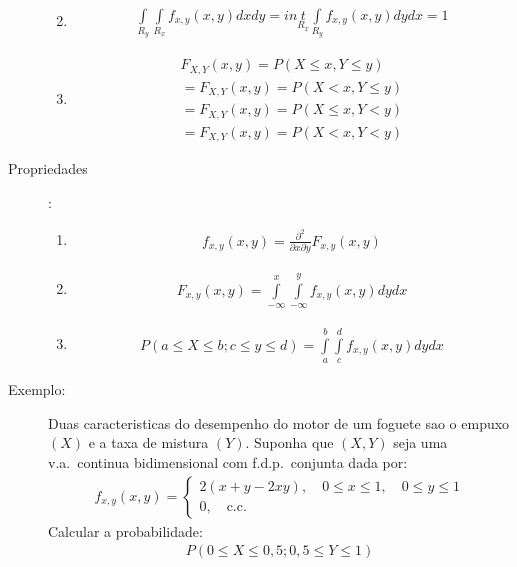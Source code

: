 \begin{description}
\begin{enumerate}[leftmargin=*, label=\roman*., widest=IV, align=left]
\begin{align}
     \end{align} 
    \item  
     \begin{align*}
      \int \limits_{R_{y}} \int \limits_{R_{x}} f_{x,y} (x,y) dx dy = int \limits_{R_{x}} \int \limits_{R_{y}} f_{x,y} (x,y) dy dx= 1
     \end{align*} 
    \item 
      \begin{align*}
        F_{X,Y}(x,y) = P(X \leq x, Y\leq y)\\
        = F_{X,Y}(x,y) = P(X < x, Y\leq y)\\
        = F_{X,Y}(x,y) = P(X \leq x, Y< y)\\
        = F_{X,Y}(x,y) = P(X<x, Y<y)
      \end{align*}
  \end{enumerate}
\item[Propriedades]:
  \begin{enumerate}[label=(\alph*)]
    \item 
      \begin{align*}
        f_{x,y} (x,y)= \frac{\partial^2}{\partial x \partial y}F_{x,y} (x,y)
      \end{align*}
    \item 
      \begin{align*}
        F_{x,y} (x,y)= \int \limits_{- \infty}^{x} \int \limits_{- \infty}^{y} f_{x,y}(x,y) dy dx
      \end{align*}
      \item 
        \begin{align*} 
          P(a \leq X \leq b ; c \leq y \leq d) = \int \limits_{a}^{b} \int \limits_{c}^{d} f_{x,y} (x,y) dy dx
        \end{align*}
  \end{enumerate}
\item [Exemplo:] Duas caracteristicas do desempenho do motor de um foguete sao o empuxo $(X)$ e a taxa de mistura $(Y)$. Suponha que $(X,Y)$ seja uma v.a.\ continua bidimensional com f.d.p.\ conjunta dada por:
  \begin{align*}
    f_{x,y} (x,y)= \begin{cases}
      2(x+y-2xy), \quad 0\leq x \leq 1, \quad 0 \leq y \leq 1\\
      0, \quad \text{c.c.}
    \end{cases}
  \end{align*}
  Calcular a probabilidade:
  \begin{align*}
    P(0 \leq X \leq 0,5; 0,5 \leq Y \leq 1)  \\

\end{align*}
\end{description}
